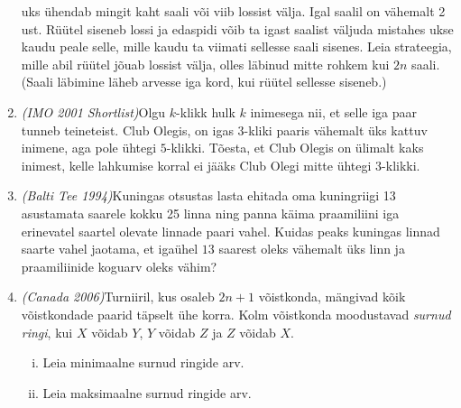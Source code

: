 \documentclass{article}
\begin{document}
\begin{enumerate}
  uks ühendab mingit kaht saali või viib lossist välja. Igal saalil on
  vähemalt 2 ust. Rüütel siseneb lossi ja edaspidi võib ta igast
  saalist väljuda mistahes ukse kaudu peale selle, mille kaudu ta
  viimati sellesse saali sisenes.  Leia strateegia, mille abil rüütel
  jõuab lossist välja, olles läbinud mitte rohkem kui $2n$
  saali. (Saali läbimine läheb arvesse iga kord, kui rüütel sellesse
  siseneb.)
\item \emph{(IMO 2001 Shortlist)}\@ Olgu $k$-klikk hulk $k$ inimesega
  nii, et selle iga paar tunneb teineteist. Club Olegis, on igas
  $3$-kliki paaris vähemalt üks kattuv inimene, aga pole ühtegi
  $5$-klikki. Tõesta, et Club Olegis on ülimalt kaks inimest, kelle
  lahkumise korral ei jääks Club Olegi mitte ühtegi $3$-klikki.
\item \emph{(Balti Tee 1994)}\@ Kuningas otsustas lasta ehitada oma
  kuningriigi 13 asustamata saarele kokku 25 linna ning panna käima
  praamiliini iga erinevatel saartel olevate linnade paari
  vahel. Kuidas peaks kuningas linnad saarte vahel jaotama, et igaühel
  $13$ saarest oleks vähemalt üks linn ja praamiliinide koguarv oleks
  vähim?
\item \emph{(Canada 2006)}\@ Turniiril, kus osaleb $2n + 1$
  võistkonda, mängivad kõik võistkondade paarid täpselt ühe
  korra. Kolm võistkonda moodustavad \emph{surnud ringi}, kui $X$
  võidab $Y$, $Y$ võidab $Z$ ja $Z$ võidab $X$.
  \begin{enumerate}[(i)]
  \item Leia minimaalne surnud ringide arv.
  \item Leia maksimaalne surnud ringide arv.
  \end{enumerate}
\end{enumerate}
\end{document}
